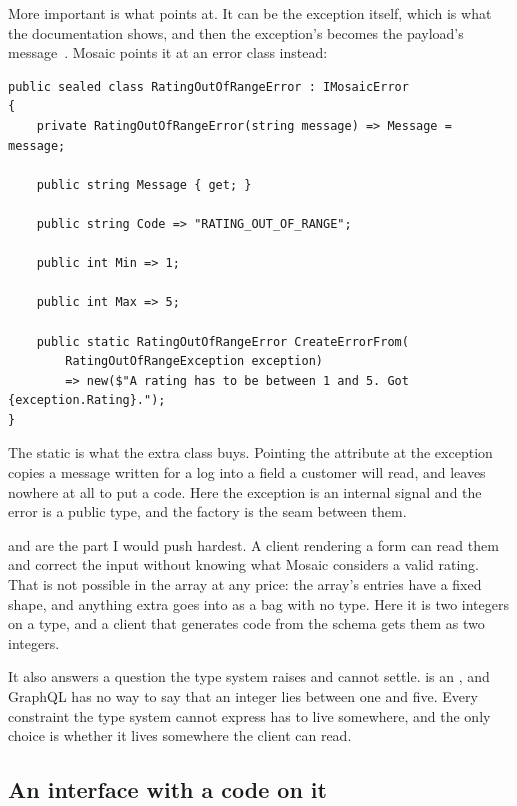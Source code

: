 More important is what  points at. It can be the exception itself, which
is what the documentation shows, and then the exception's  becomes
the payload's message~\autocite{chillicream2026mutations}. Mosaic points it at
an error class instead:

\begin{verbatim}
public sealed class RatingOutOfRangeError : IMosaicError
{
    private RatingOutOfRangeError(string message) => Message = message;

    public string Message { get; }

    public string Code => "RATING_OUT_OF_RANGE";

    public int Min => 1;

    public int Max => 5;

    public static RatingOutOfRangeError CreateErrorFrom(
        RatingOutOfRangeException exception)
        => new($"A rating has to be between 1 and 5. Got {exception.Rating}.");
}
\end{verbatim}

The static  is what the extra class buys. Pointing the
attribute at the exception copies a message written for a log into a field a
customer will read, and leaves nowhere at all to put a code. Here the exception
is an internal signal and the error is a public type, and the factory is the
seam between them.

%
 and  are the part I would push hardest. A client rendering
a form can read them and correct the input without knowing what Mosaic considers
a valid rating. That is not possible in the  array at any price:
the array's entries have a fixed shape, and anything extra goes into
 as a bag with no type. Here it is two integers on a type, and
a client that generates code from the schema gets them as two integers.

It also answers a question the type system raises and cannot settle.
 is an , and GraphQL has no way to say that an integer
lies between one and five. Every constraint the type system cannot express has
to live somewhere, and the only choice is whether it lives somewhere the client
can read.

\subsection*{An interface with a code on it}

